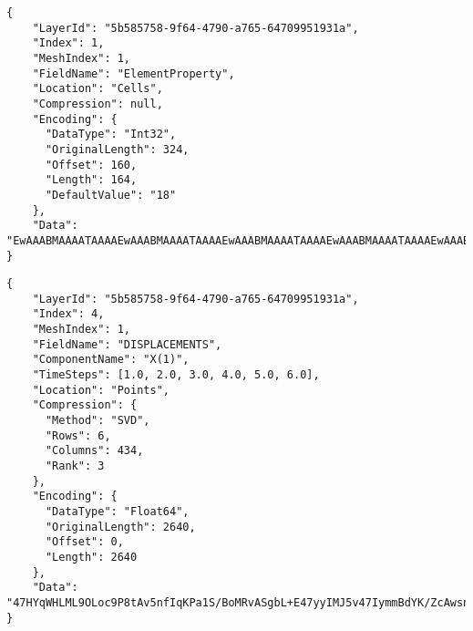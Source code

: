 \begin{lstlisting}[style=json,caption=Example of attribute.json document.,label=lst:attribute.json]
{
    "LayerId": "5b585758-9f64-4790-a765-64709951931a",
    "Index": 1,
    "MeshIndex": 1,
    "FieldName": "ElementProperty",
    "Location": "Cells",
    "Compression": null,
    "Encoding": {
      "DataType": "Int32",
      "OriginalLength": 324,
      "Offset": 160,
      "Length": 164,
      "DefaultValue": "18"
    },
    "Data": "EwAAABMAAAATAAAAEwAAABMAAAATAAAAEwAAABMAAAATAAAAEwAAABMAAAATAAAAEwAAABMAAAATAAAAEwAAAB..."
}
\end{lstlisting}

\begin{lstlisting}[style=json,caption=Example of result.json document.,label=lst:result.json]
{
    "LayerId": "5b585758-9f64-4790-a765-64709951931a",
    "Index": 4,
    "MeshIndex": 1,
    "FieldName": "DISPLACEMENTS",
    "ComponentName": "X(1)",
    "TimeSteps": [1.0, 2.0, 3.0, 4.0, 5.0, 6.0],
    "Location": "Points",
    "Compression": {
      "Method": "SVD",
      "Rows": 6,
      "Columns": 434,
      "Rank": 3
    },
    "Encoding": {
      "DataType": "Float64",
      "OriginalLength": 2640,
      "Offset": 0,
      "Length": 2640
    },
    "Data": "47HYqWHLML9OLoc9P8tAv5nfIqKPa1S/BoMRvASgbL+E47yyIMJ5v47IymmBdYK/ZcAwsn55IL+uuEUHN3swv1..."
}
\end{lstlisting}